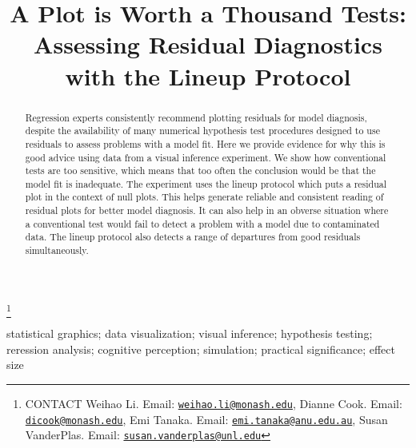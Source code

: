\documentclass[]{interact}
\theoremstyle{plain}%
\theoremstyle{definition}
\theoremstyle{remark}
\begin{document}

\title{A Plot is Worth a Thousand Tests: Assessing Residual Diagnostics
with the Lineup Protocol}


\author{
}

\thanks{CONTACT Weihao
Li. Email: \href{mailto:weihao.li@monash.edu}{\nolinkurl{weihao.li@monash.edu}}, Dianne
Cook. Email: \href{mailto:dicook@monash.edu}{\nolinkurl{dicook@monash.edu}}, Emi
Tanaka. Email: \href{mailto:emi.tanaka@anu.edu.au}{\nolinkurl{emi.tanaka@anu.edu.au}}, Susan
VanderPlas. Email: \href{mailto:susan.vanderplas@unl.edu}{\nolinkurl{susan.vanderplas@unl.edu}}}

\maketitle

\begin{abstract}
Regression experts consistently recommend plotting residuals for model
diagnosis, despite the availability of many numerical hypothesis test
procedures designed to use residuals to assess problems with a model
fit. Here we provide evidence for why this is good advice using data
from a visual inference experiment. We show how conventional tests are
too sensitive, which means that too often the conclusion would be that
the model fit is inadequate. The experiment uses the lineup protocol
which puts a residual plot in the context of null plots. This helps
generate reliable and consistent reading of residual plots for better
model diagnosis. It can also help in an obverse situation where a
conventional test would fail to detect a problem with a model due to
contaminated data. The lineup protocol also detects a range of
departures from good residuals simultaneously.
\end{abstract}

\begin{keywords}
statistical graphics; data visualization; visual inference; hypothesis
testing; reression analysis; cognitive perception; simulation; practical
significance; effect size
\end{keywords}
\end{document}
